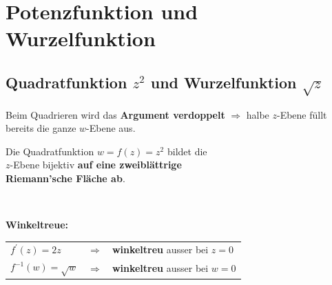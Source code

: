 \section{Potenzfunktion und Wurzelfunktion}
	\subsection{Quadratfunktion $z^2$ und Wurzelfunktion $\sqrt{z}$}
		Beim Quadrieren wird das \textbf{Argument verdoppelt} $\Rightarrow$ halbe $z$-Ebene füllt bereits die ganze $w$-Ebene aus.\\[3pt]
		\begin{minipage}[t]{0.5\textwidth}
			\scalebox{0.5}{}
		\end{minipage}
		\begin{minipage}[t]{0.5\textwidth}
			\scalebox{0.5}{}
		\end{minipage}
		\begin{minipage}[]{0.5\textwidth}
			\begin{framed}
				Die Quadratfunktion $w = f\left( z \right) = z^2$ bildet die\\[3pt]
				$z$-Ebene bijektiv \textbf{auf eine zweiblättrige\\[3pt] Riemann'sche Fläche ab}.
			\end{framed}
		\end{minipage}
		\begin{minipage}[]{0.5\textwidth}
			\centering
		\end{minipage}\\[3pt]
		\begin{minipage}[]{0.15\textwidth}
			\textbf{Winkeltreue:}
		\end{minipage}
		\begin{minipage}[]{0.5\textwidth}
			\begin{framed}
				\begin{tabular}{lll}
					$f^{\prime}\left( z \right) = 2 z$ & $\Rightarrow$ & \textbf{winkeltreu} ausser bei $z = 0$\\[3pt]
					$f^{-1}\left( w \right) = \sqrt{w}$ & $\Rightarrow$ & \textbf{winkeltreu} ausser bei $w = 0$\\[3pt]
				\end{tabular}
			\end{framed}
		\end{minipage}
